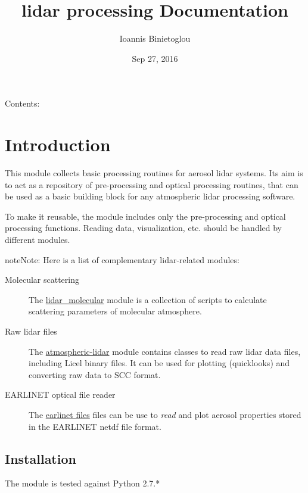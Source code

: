\documentclass[letterpaper,10pt,english]{sphinxmanual}
\title{lidar processing Documentation}
\date{Sep 27, 2016}
\author{Ioannis Binietoglou}
\begin{document}
\maketitle
\tableofcontents
{}\label{index::doc}


Contents:


\chapter{Introduction}
\label{introduction:introduction}\label{introduction:welcome-to-lidar-processing-s-documentation}\label{introduction::doc}
This module collects basic processing routines for aerosol lidar systems. Its aim is to act as a repository
of pre-processing and optical processing routines, that can be used as a basic building block for any atmospheric
lidar processing software.

To make it reusable, the module includes only the pre-processing and optical processing functions.
Reading data, visualization, etc. should be handled by different modules.

\begin{notice}{note}{Note:}
Here is a list of complementary lidar-related modules:
\begin{description}
\item[{Molecular scattering}] \leavevmode
The \href{https://bitbucket.org/iannis\_b/lidar\_molecular}{lidar\_molecular}  module is a collection of scripts to calculate
scattering parameters of molecular atmosphere.

\item[{Raw lidar files}] \leavevmode
The \href{https://bitbucket.org/iannis\_b/atmospheric-lidar}{atmospheric-lidar} module contains classes to read raw lidar
data files, including Licel binary files. It can be used for plotting (quicklooks) and converting raw data to
SCC format.

\item[{EARLINET optical file reader}] \leavevmode
The \href{https://bitbucket.org/iannis\_b/earlinet-optical-file-reader}{earlinet files} files can be use to \emph{read} and
plot aerosol properties stored in the EARLINET netdf file format.

\end{description}
\end{notice}


\section{Installation}
\label{introduction:installation}
The module is tested against Python 2.7.*
\end{document}
